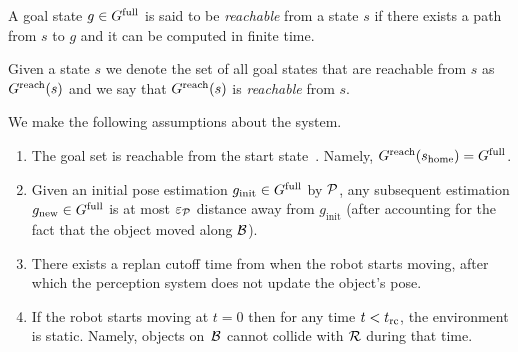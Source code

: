 \documentclass[conference]{IEEEtran}
\begin{document}
\begin{definition}
    A goal state $g \in G^{\textrm{full}}$ is said to be \emph{reachable} from a state $s$ if there exists a path from $s$ to $g$ and it can be computed in finite time.
\end{definition}

Given a state $s$ we denote the set of all goal states that are reachable from $s$ as $G^{\rm reach}(s)$ and we say that $G^{\rm reach}(s)$ is \emph{reachable} from $s$.



We make the following assumptions about the system.
\begin{enumerate}[label={\textbf{A\arabic*}},leftmargin=0.75cm]
    \item \label{assum:1} The goal set \Gfull is reachable from the start state~\Shome. Namely,  $G^{\rm reach}(s_{\textrm{home}}) = G^{\textrm{full}}$.
    

 
    \item \label{assum:3} Given an initial pose estimation $g_{\textrm{init}} \in G^{\textrm{full}}$ by $\mathcal{P}$, any subsequent estimation $g_{\textrm{new}} \in G^{\textrm{full}}$ is at most $\varepsilon_\mathcal{P}$ distance away from $g_{\textrm{init}}$ (after accounting for the fact that the object moved along $\mathcal{B}$).

    \item \label{assum:4} There exists a replan cutoff time \Trc from when the robot starts moving, after which the perception system does not update the object's pose.
    
    \item \label{assum:5} If the robot starts moving at $t = 0$ then for any time $t < t_{\textrm{rc}}$, the environment is static. Namely, objects on~$\mathcal{B}$ cannot collide with $\mathcal{R}$ during that time.
\end{enumerate}
\end{document}
